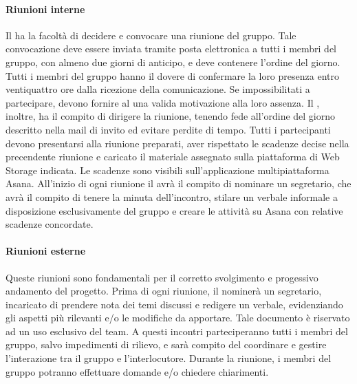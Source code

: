 			\paragraph{Riunioni interne}
			Il \textit{\RdP} ha la facoltà di decidere e convocare una riunione del gruppo. Tale convocazione deve essere inviata tramite posta elettronica a tutti i membri del gruppo, con almeno due giorni di anticipo, e deve contenere l’ordine del giorno. Tutti i membri del gruppo hanno il dovere di confermare la loro presenza entro ventiquattro ore dalla ricezione della comunicazione. Se impossibilitati a partecipare, devono fornire al \textit{\RdP} una valida motivazione alla loro assenza. Il \textit{\RdP}, inoltre, ha il compito di dirigere la riunione, tenendo fede all’ordine del giorno descritto nella mail di invito ed evitare perdite di tempo. Tutti i partecipanti devono presentarsi alla riunione preparati, aver rispettato le scadenze decise nella precendente riunione e caricato il materiale assegnato sulla piattaforma di Web Storage indicata. Le scadenze sono visibili sull'applicazione multipiattaforma Asana.
			All’inizio di ogni riunione il \textit{\RdP} avrà il compito di nominare un segretario, che avrà il compito di tenere la minuta dell’incontro, stilare un verbale informale a disposizione esclusivamente del gruppo e creare le attività su Asana con relative scadenze concordate.  
		
			\paragraph{Riunioni esterne}
			Queste riunioni sono fondamentali per il corretto svolgimento e progessivo andamento del progetto. Prima di ogni riunione, il \textit{\RdP} nominerà un segretario, incaricato di prendere nota dei temi discussi e redigere un verbale, evidenziando gli aspetti più rilevanti e/o le modifiche da apportare. Tale documento è riservato ad un uso esclusivo del team.
			A questi incontri parteciperanno tutti i membri del gruppo, salvo impedimenti di rilievo, e sarà compito del \textit{\RdP} coordinare e gestire l’interazione tra il gruppo e l’interlocutore. Durante la riunione, i membri del gruppo potranno effettuare domande e/o chiedere chiarimenti. 

